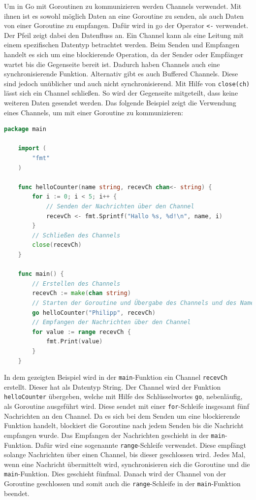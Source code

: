 \documentclass[fontsize=12pt,paper=a4,twoside=semi,parskip=half-,headsepline,headinclude]{scrreprt}
\begin{document}
Um in Go mit Goroutinen zu kommunizieren werden Channels\cite{donovan2015} verwendet. Mit ihnen ist es sowohl möglich Daten an eine Goroutine zu senden, als auch Daten von einer Goroutine zu empfangen. Dafür wird in go der Operator \texttt{<-} verwendet. Der Pfeil zeigt dabei den Datenfluss an. Ein Channel kann als eine Leitung mit einem spezifischen Datentyp betrachtet werden. Beim Senden und Empfangen handelt es sich um eine blockierende Operation, da der Sender oder Empfänger wartet bis die Gegenseite bereit ist. Dadurch haben Channels auch eine synchronisierende Funktion. Alternativ gibt es auch Buffered Channels. Diese sind jedoch unüblicher und auch nicht synchronisierend. Mit Hilfe von \texttt{close(ch)} lässt sich ein Channel schließen. So wird der Gegenseite mitgeteilt, dass keine weiteren Daten gesendet werden. Das folgende Beispiel zeigt die Verwendung eines Channels, um mit einer Goroutine zu kommunizieren:

\begin{lstlisting}[language=Go,extendedchars=true]
	package main

	import (
		"fmt"
	)

	func helloCounter(name string, recevCh chan<- string) {
		for i := 0; i < 5; i++ {
			// Senden der Nachrichten über den Channel
			recevCh <- fmt.Sprintf("Hallo %s, %d!\n", name, i)
		}
		// Schließen des Channels
		close(recevCh)
	}

	func main() {
		// Erstellen des Channels
		recevCh := make(chan string)
		// Starten der Goroutine und Übergabe des Channels und des Namens
		go helloCounter("Philipp", recevCh)
		// Empfangen der Nachrichten über den Channel
		for value := range recevCh {
			fmt.Print(value)
		}
	}
\end{lstlisting}

In dem gezeigten Beispiel wird in der \texttt{main}-Funktion ein Channel \texttt{recevCh} erstellt. Dieser hat als Datentyp String. Der Channel wird der Funktion \texttt{helloCounter} übergeben, welche mit Hilfe des Schlüsselwortes \texttt{go}, nebenläufig, als Goroutine ausgeführt wird. Diese sendet mit einer \texttt{for}-Schleife insgesamt fünf Nachrichten an den Channel. Da es sich bei dem Senden um eine blockierende Funktion handelt, blockiert die Goroutine nach jedem Senden bis die Nachricht empfangen wurde. Das Empfangen der Nachrichten geschieht in der \texttt{main}-Funktion. Dafür wird eine sogenannte \texttt{range}-Schleife verwendet. Diese empfängt solange Nachrichten über einen Channel, bis dieser geschlossen wird.  Jedes Mal, wenn eine Nachricht übermittelt wird, synchronisieren sich die Goroutine und die \texttt{main}-Funktion. Dies geschieht fünfmal. Danach wird der Channel von der Goroutine geschlossen und somit auch die \texttt{range}-Schleife in der \texttt{main}-Funktion beendet.
\end{document}

